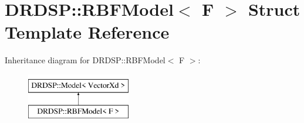 \hypertarget{struct_d_r_d_s_p_1_1_r_b_f_model}{\section{D\-R\-D\-S\-P\-:\-:R\-B\-F\-Model$<$ F $>$ Struct Template Reference}
\label{struct_d_r_d_s_p_1_1_r_b_f_model}
}
Inheritance diagram for D\-R\-D\-S\-P\-:\-:R\-B\-F\-Model$<$ F $>$\-:\begin{figure}[H]
\begin{center}
\leavevmode
\includegraphics[height=2.000000cm]{struct_d_r_d_s_p_1_1_r_b_f_model}
\end{center}
\end{figure}
